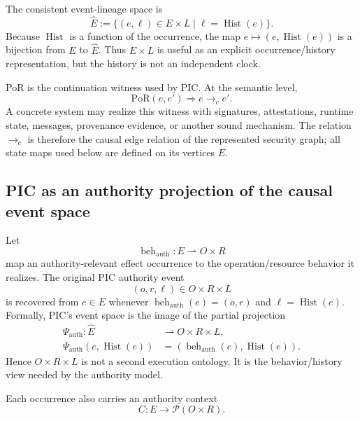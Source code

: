 \documentclass[10pt,twocolumn]{article}
\newcommand{\PoR}{\mathrm{PoR}}
\newcommand{\powerset}{\mathcal{P}}
\newcommand{\Hist}{\operatorname{Hist}}
\newcommand{\Beh}{\operatorname{beh}}
\begin{document}
The consistent event-lineage space is
\begin{equation}
  \widehat E
  :=\{(e,\ell)\in E\times L\mid \ell=\Hist(e)\}.
  \label{eq:ehat}
\end{equation}
Because $\Hist$ is a function of the occurrence, the map
$e\mapsto(e,\Hist(e))$ is a bijection from $E$ to $\widehat E$.  Thus $E\times
L$ is useful as an explicit occurrence/history representation, but the history
is not an independent clock.

PoR is the continuation witness used by PIC.  At the semantic level,
\begin{equation}
  \PoR(e,e')\Longrightarrow e\to_c e'.
  \label{eq:por-sound}
\end{equation}
A concrete system may realize this witness with signatures, attestations,
runtime state, messages, provenance evidence, or another sound mechanism.  The
relation $\to_c$ is therefore the causal edge relation of the represented
security graph; all state maps used below are defined on its vertices $E$.

\subsection{PIC as an authority projection of the causal event space}

Let
\begin{equation}
  \Beh_{\mathrm{auth}}:E\rightharpoonup O\times R
\end{equation}
map an authority-relevant effect occurrence to the operation/resource behavior
it realizes.  The original PIC authority event
\begin{equation}
  (o,r,\ell)\in O\times R\times L
\end{equation}
is recovered from $e\in E$ whenever
$\Beh_{\mathrm{auth}}(e)=(o,r)$ and $\ell=\Hist(e)$.  Formally, PIC's event
space is the image of the partial projection
\begin{equation}
\begin{aligned}
  \Psi_{\mathrm{auth}}:\widehat E &\rightharpoonup O\times R\times L,\\
  \Psi_{\mathrm{auth}}(e,\Hist(e))
   &= (\Beh_{\mathrm{auth}}(e),\Hist(e)).
\end{aligned}
\label{eq:pic-projection}
\end{equation}
Hence $O\times R\times L$ is not a second execution ontology.  It is the
behavior/history view needed by the authority model.

Each occurrence also carries an authority context
\begin{equation}
  C:E\to\powerset(O\times R).
  \label{eq:authority-state-map}
\end{equation}
\end{document}
